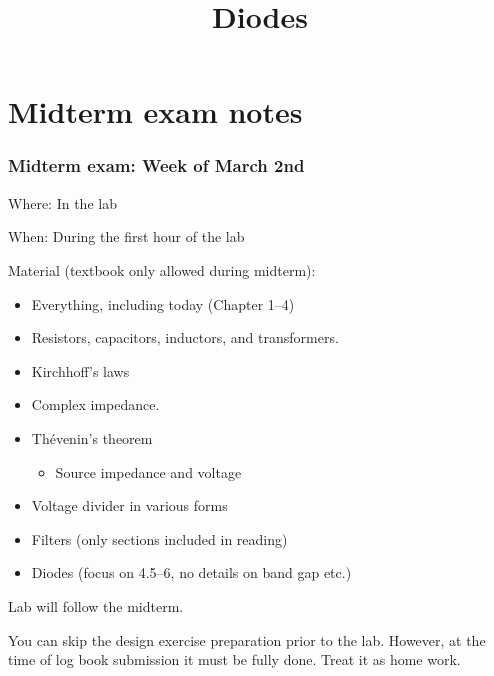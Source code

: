 \documentclass[beamer]{standalone}
\begin{document}
\title[Electronics 1]{Diodes}

\begin{frame} 
  \titlepage
\end{frame}


\section{Midterm exam notes}
\begin{frame}
 \frametitle{Midterm exam: Week of March 2nd}
  Where: In the lab

  When: During the first hour of the lab

  Material (\alert{textbook only} allowed during midterm): 
  \begin{itemize}
    \item Everything, including today (Chapter 1--4)
    \item Resistors, capacitors, inductors, and transformers.
    \item Kirchhoff's laws
    \item Complex impedance.
    \item Th\'{e}venin's theorem
      \begin{itemize}
        \item Source impedance and voltage
      \end{itemize}
    \item Voltage divider in various forms
    \item Filters (only sections included in reading)
    \item Diodes (focus on 4.5--6, no details on band gap etc.)
  \end{itemize}

  \alert{Lab will follow the midterm.}

  You can skip the design exercise preparation prior to the lab. However, at the time of log book submission it must be fully done. Treat it as home work.
\end{frame}
  
\end{document}
